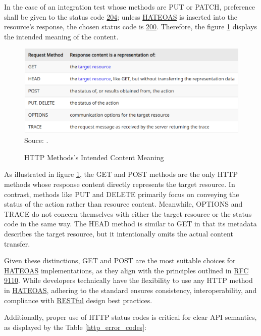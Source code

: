 In the case of an integration test whose methods are PUT or PATCH, preference shall be given to the status code \hyperref[tab:summary_http_status_codes]{204}; 
unless \hyperref[appendix:glossary]{HATEOAS} is inserted into the resource's response, the chosen status code is \hyperref[tab:summary_http_status_codes]{200}. Therefore, the figure \ref{fig:http-methods-intenteded-content} displays the intended meaning of the content.

\begin{figure}[H]
    \centering
    \caption{HTTP Methods's Intended Content Meaning}
    \includegraphics[width=1\linewidth]{figures/http/http_200_response_analyses.png}
    \label{fig:http-methods-intenteded-content}
    \footnotesize Souce: \cite{rfc9110}.
\end{figure}

As illustrated in figure \ref{fig:http-methods-intenteded-content}, the GET and POST methods are the only HTTP methods whose response content directly represents the target resource. In contrast, methods like PUT and DELETE primarily focus on conveying the status of the action rather than resource content. Meanwhile, OPTIONS and TRACE do not concern themselves with either the target resource or the status code in the same way. The HEAD method is similar to GET in that its metadata describes the target resource, but it intentionally omits the actual content transfer.

Given these distinctions, GET and POST are the most suitable choices for \hyperref[appendix:glossary]{HATEOAS} implementations, as they align with the principles outlined in \hyperref[appendix:glossary]{RFC} \href{https://www.rfc-editor.org/rfc/rfc9110.html}{9110}. While developers technically have the flexibility to use any HTTP method in \hyperref[appendix:glossary]{HATEOAS}, adhering to the standard ensures consistency, interoperability, and compliance with \hyperref[appendix:glossary]{RESTful} design best practices.

Additionally, proper use of HTTP status codes is critical for clear API semantics, as displayed by the Table \ref{http_error_codes}:

